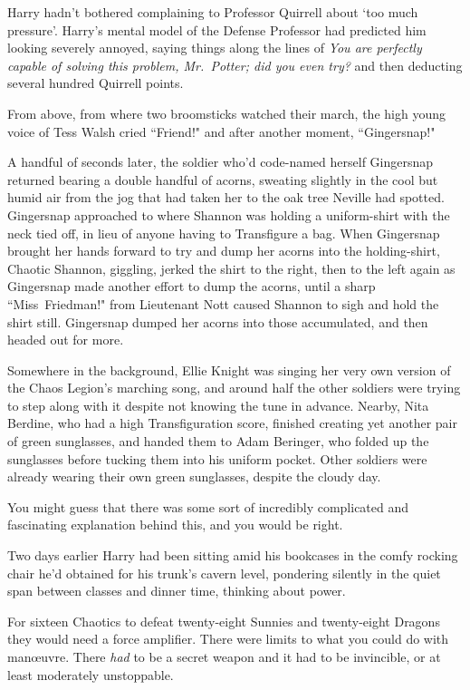 Harry hadn't bothered complaining to Professor Quirrell about `too much pressure'. Harry's mental model of the Defense Professor had predicted him looking severely annoyed, saying things along the lines of \emph{You are perfectly capable of solving this problem, Mr.~Potter; did you even try?} and then deducting several hundred Quirrell points.

From above, from where two broomsticks watched their march, the high young voice of Tess Walsh cried ``Friend!" and after another moment, ``Gingersnap!"

A handful of seconds later, the soldier who'd code-named herself Gingersnap returned bearing a double handful of acorns, sweating slightly in the cool but humid air from the jog that had taken her to the oak tree Neville had spotted. Gingersnap approached to where Shannon was holding a uniform-shirt with the neck tied off, in lieu of anyone having to Transfigure a bag. When Gingersnap brought her hands forward to try and dump her acorns into the holding-shirt, Chaotic Shannon, giggling, jerked the shirt to the right, then to the left again as Gingersnap made another effort to dump the acorns, until a sharp ``Miss~Friedman!" from Lieutenant Nott caused Shannon to sigh and hold the shirt still. Gingersnap dumped her acorns into those accumulated, and then headed out for more.

Somewhere in the background, Ellie Knight was singing her very own version of the Chaos Legion's marching song, and around half the other soldiers were trying to step along with it despite not knowing the tune in advance. Nearby, Nita Berdine, who had a high Transfiguration score, finished creating yet another pair of green sunglasses, and handed them to Adam Beringer, who folded up the sunglasses before tucking them into his uniform pocket. Other soldiers were already wearing their own green sunglasses, despite the cloudy day.

You might guess that there was some sort of incredibly complicated and fascinating explanation behind this, and you would be right.

Two days earlier Harry had been sitting amid his bookcases in the comfy rocking chair he'd obtained for his trunk's cavern level, pondering silently in the quiet span between classes and dinner time, thinking about power.

For sixteen Chaotics to defeat twenty-eight Sunnies and twenty-eight Dragons they would need a force amplifier. There were limits to what you could do with manœuvre. There \emph{had} to be a secret weapon and it had to be invincible, or at least moderately unstoppable.

